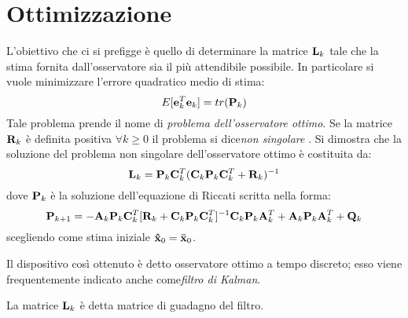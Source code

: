 \section{Ottimizzazione}
L'obiettivo che ci si prefigge è quello di determinare la matrice $\mathbf{L}_k$ tale che la stima fornita dall'osservatore sia il più attendibile possibile.
In particolare si vuole minimizzare l'errore quadratico medio di stima:
\[E[\mathbf{e}_k^T\mathbf{e}_k]=tr(\mathbf{P}_k)\]
Tale problema prende il nome di \textit{problema dell'osservatore ottimo}.
Se la matrice $\mathbf{R}_k$ è definita positiva $ \forall k \geq 0$ il problema si dice\textit{non singolare }.
Si dimostra \citep{kalmanbucy} che la soluzione del problema non singolare dell'osservatore ottimo è costituita da:
\[\mathbf{L}_k = \mathbf{P}_k\mathbf{C}_k^T(\mathbf{C}_k\mathbf{P}_k\mathbf{C}_k^T + \mathbf{R}_k)^{-1}\]
dove $\mathbf{P}_k$ è la soluzione dell'equazione di Riccati scritta nella forma:
\[\mathbf{P}_{k+1}=-\mathbf{A}_k\mathbf{P}_k\mathbf{C}_k^T[\mathbf{R}_k+\mathbf{C}_k\mathbf{P}_k\mathbf{C}_k^T]^{-1}\mathbf{C}_k\mathbf{P}_k\mathbf{A}_k^T+\mathbf{A}_k\mathbf{P}_k\mathbf{A}_k^T+\mathbf{Q}_k\]
scegliendo come stima iniziale $\mathbf{\hat{x}}_0=\mathbf{\bar{x}}_0$.

Il dispositivo così ottenuto è detto osservatore ottimo a tempo discreto; esso viene frequentemente indicato anche come\textit{filtro di Kalman}.

La matrice $\mathbf{L}_k$ è detta matrice di guadagno del filtro.   
